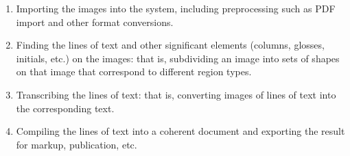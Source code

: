 \begin{enumerate}
	\item Importing the images into the system, including preprocessing such as PDF import and other format conversions.
	\item Finding the lines of text and other significant elements
	      (columns, glosses, initials, etc.) on the images: that is, subdividing an image
	      into sets of shapes on that image that correspond to different region types.
	\item Transcribing the lines of text: that is, converting images of lines of text into the corresponding text.
	\item Compiling the lines of text into a coherent document and exporting the result for markup, publication, etc.
\end{enumerate}

